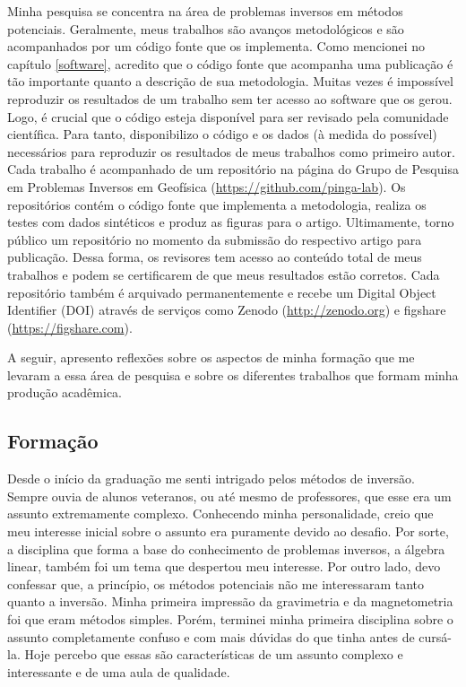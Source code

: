 \documentclass[12pt,a4paper,oneside,titlepage,onecolumn]{article}
\begin{document}
Minha pesquisa se concentra na área de problemas inversos em métodos
potenciais.
Geralmente, meus trabalhos são avanços metodológicos e são acompanhados por
um código fonte que os implementa.
Como mencionei no capítulo \ref{software}, acredito que o código fonte que
acompanha uma publicação é tão importante quanto a descrição de sua
metodologia.
Muitas vezes é impossível reproduzir os resultados de um trabalho
sem ter acesso ao software que os gerou.
Logo, é crucial que o código esteja disponível para ser revisado pela
comunidade científica.
Para tanto, disponibilizo o código e os dados (à medida do possível) necessários
para reproduzir os resultados de meus trabalhos como primeiro autor.
Cada trabalho é acompanhado de um repositório na página do Grupo de Pesquisa em
Problemas Inversos em Geofísica (\url{https://github.com/pinga-lab}).
Os repositórios contém o código fonte que implementa a metodologia, realiza os
testes com dados sintéticos e produz as figuras para o artigo.
Ultimamente, torno público um repositório no momento da submissão do respectivo
artigo para publicação.
Dessa forma, os revisores tem acesso ao conteúdo total de meus trabalhos e
podem se certificarem de que meus resultados estão corretos.
Cada repositório também é arquivado permanentemente e recebe um Digital Object
Identifier (DOI) através de serviços como Zenodo (\url{http://zenodo.org}) e
figshare (\url{https://figshare.com}).

A seguir, apresento reflexões sobre os aspectos de minha formação que me
levaram a essa área de pesquisa e sobre os diferentes trabalhos que formam
minha produção acadêmica.


\subsection{Formação}

Desde o início da graduação me senti intrigado pelos métodos de inversão.
Sempre ouvia de alunos veteranos, ou até mesmo de professores, que esse era um
assunto extremamente complexo.
Conhecendo minha personalidade, creio que meu interesse inicial sobre o assunto
era puramente devido ao desafio.
Por sorte, a disciplina que forma a base do conhecimento de problemas inversos,
a álgebra linear, também foi um tema que despertou meu interesse.
Por outro lado, devo confessar que, a princípio, os métodos potenciais não me
interessaram tanto quanto a inversão.
Minha primeira impressão da gravimetria e da magnetometria foi que eram métodos
simples.
Porém, terminei minha primeira disciplina sobre o assunto completamente confuso
e com mais dúvidas do que tinha antes de cursá-la.
Hoje percebo que essas são características de um assunto complexo e
interessante e de uma aula de qualidade.
\end{document}
